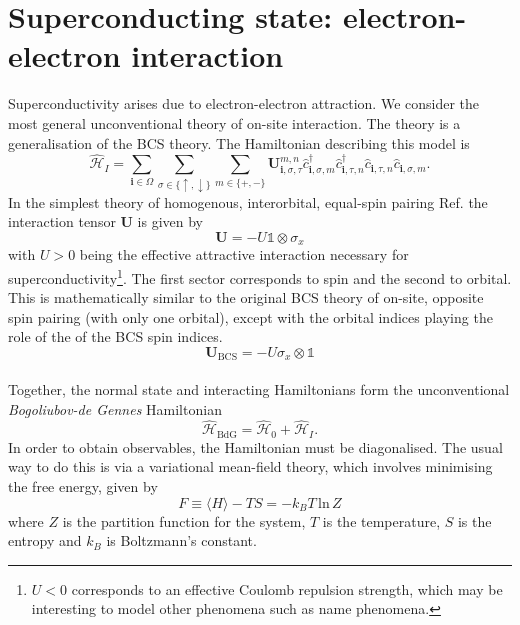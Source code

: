 \section{Superconducting state: electron-electron interaction}
\label{sec:general_SC_state}
Superconductivity arises due to electron-electron attraction. We consider the most general unconventional theory of on-site interaction. The theory is a generalisation of the BCS theory. The Hamiltonian describing this model is
\begin{equation}
\hat{\mathcal H}_I =  \sum_{\mathbf{i}\in\Omega}\sum_{\sigma\in\{\uparrow,\downarrow\}} \sum_{m\in\{+,-\}} \bm{U}_{\mathbf{i},\sigma,\tau}^{m,n}
\hat c_{\mathbf{i}, \sigma, m}^\dagger \hat c_{\mathbf{i}, \tau, n}^\dagger \hat c_{\mathbf{i}, \tau, n} \hat c_{\mathbf{i}, \sigma, m}.
\label{eq:interacting_Hamiltonian}
\end{equation}
In the simplest theory of homogenous, interorbital, equal-spin pairing Ref. \cite{PhysRevLett.117.027001} the interaction tensor $\bm{U}$ is given by
\begin{equation}
\bm{U}=-U\mathbb{1}\otimes\sigma_x
\end{equation}
with $U>0$ being the effective attractive interaction necessary for superconductivity\footnote{$U<0$ corresponds to an effective Coulomb repulsion strength, which may be interesting to model other phenomena  such as {\color{red}name phenomena}.}. The first sector corresponds to spin and the second to orbital. This is mathematically similar to the original BCS theory of on-site, opposite spin pairing (with only one orbital), except with the orbital indices playing the role of the of the BCS spin indices.
\begin{equation}
\bm{U}_\text{BCS}=-U\sigma_x\otimes\mathbb{1}
\end{equation}
\\
Together, the normal state and interacting Hamiltonians form the unconventional \textit{Bogoliubov-de Gennes} Hamiltonian
\begin{equation}
\hat{\mathcal{H}}_\text{BdG}= \hat{\mathcal H}_0 + \hat{\mathcal H}_I.
\end{equation}
In order to obtain observables, the Hamiltonian must be diagonalised. The usual way to do this is via a variational mean-field theory, which involves minimising the free energy, given by
\begin{equation}
F\equiv\langle H \rangle - TS = -k_B T \,\text{ln}\,Z
\end{equation}
where $Z$ is the partition function for the system, $T$ is the temperature, $S$ is the entropy and $k_B$ is Boltzmann's constant.

